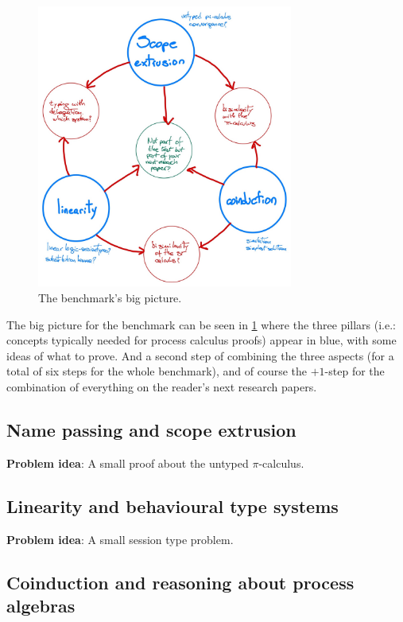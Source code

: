 \documentclass{article}
\begin{document}
\begin{figure}[h]
  \centering
  \includegraphics[width=0.75\textwidth]{images/benchmark.jpeg}
  \caption{The benchmark's big picture.}
  \label{fig:bigpic}
\end{figure}

The big picture for the benchmark can be seen in \cref{fig:bigpic}
where the three pillars (i.e.: concepts typically needed for process
calculus proofs) appear in blue, with some ideas of what to prove. And
a second step of combining the three aspects (for a total of six steps
for the whole benchmark), and of course the $+1$-step for the
combination of everything on the reader's next research papers.

\subsection{Name passing and scope extrusion}

\textbf{Problem idea}: A small proof about the untyped $\pi$-calculus.

\subsection{Linearity and behavioural type systems}

\textbf{Problem idea}: A small session type problem.

\subsection{Coinduction and reasoning about process algebras}
\end{document}
